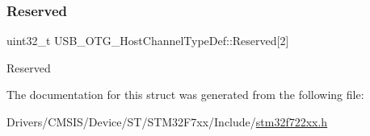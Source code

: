 \subsubsection{\texorpdfstring{Reserved}{Reserved}}
{\footnotesize\ttfamily uint32\+\_\+t U\+S\+B\+\_\+\+O\+T\+G\+\_\+\+Host\+Channel\+Type\+Def\+::\+Reserved\mbox{[}2\mbox{]}}

Reserved 

The documentation for this struct was generated from the following file\+:\begin{DoxyCompactItemize}
\item 
Drivers/\+C\+M\+S\+I\+S/\+Device/\+S\+T/\+S\+T\+M32\+F7xx/\+Include/\mbox{\hyperlink{stm32f722xx_8h}{stm32f722xx.\+h}}\end{DoxyCompactItemize}
